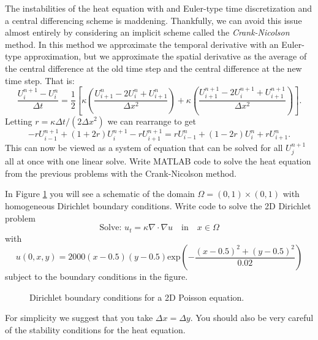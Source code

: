 \begin{problem}
    The instabilities of the heat equation with and Euler-type time discretization and a
    central differencing scheme is maddening.  Thankfully, we can avoid this issue almost
    entirely by considering an implicit scheme called the {\it Crank-Nicolson} method.  In
    this method we approximate the temporal derivative with an Euler-type approximation,
    but we approximate the spatial derivative as the average of the central difference at
    the old time step and the central difference at the new time step.  That is:
    \[ \frac{U_i^{n+1} - U_i^n}{\Delta t} = \frac{1}{2} \left[\kappa \left( \frac{U_{i+1}^n - 2U_i^n +
        U_{i+1}^n}{\Delta x^2}\right) +\kappa \left(\frac{U_{i+1}^{n+1} - 2U_i^{n+1} +
    U_{i+1}^{n+1}}{\Delta x^2} \right) \right]. \]
    Letting $r = \kappa \Delta t / (2\Delta x^2)$ we can rearrange to get
    \[ -r U_{i-1}^{n+1} + (1+2r) U_{i}^{n+1} - r U_{i+1}^{n+1} = r U_{i-1}^{n} + (1-2r)
    U_{i}^{n} + r U_{i+1}^{n}. \]
    This can now be viewed as a system of equation that can be solved for all $U_j^{n+1}$
    all at once with one linear solve.  Write MATLAB code to solve the heat equation from
    the previous problems with the Crank-Nicolson method.
\end{problem}




\begin{problem}
    In Figure \ref{fig:2DHeat_BC} you will see a schematic of the domain
    $\Omega=(0,1)\times (0,1)$ with homogeneous Dirichlet boundary conditions.  Write code
    to solve the 2D Dirichlet problem
    \[ \text{Solve: } u_t = \kappa \nabla \cdot \nabla u  \quad \text{in} \quad x \in
    \Omega \]
    with
    \[ u(0,x,y) = 2000 (x-0.5)(y-0.5)\text{exp}\left( -\frac{(x-0.5)^2 + (y-0.5)^2}{0.02} \right) \]
    subject to the boundary conditions in the figure.

    \begin{figure}[ht!]
        \centering
        \caption{Dirichlet boundary conditions for a 2D Poisson equation.}
        \label{fig:2DHeat_BC}
    \end{figure}
    For simplicity we suggest that you take $\Delta x = \Delta y$.  You should also be
    very careful of the stability conditions for the heat equation.  
\end{problem}

